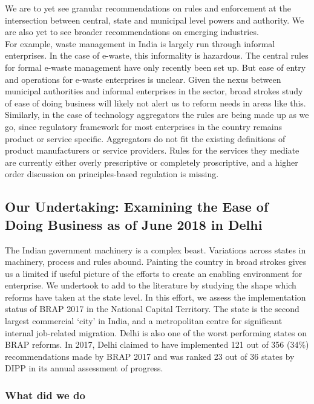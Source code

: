 \documentclass[a4paper, 12pt, twoside]{article}
\begin{document}
We are to yet see granular recommendations on rules and enforcement at the intersection between central, state and municipal level powers and authority. We are also yet to see broader recommendations on emerging industries.\\

For example, waste management in India is largely run through informal enterprises. In the case of e-waste, this informality is hazardous. The central rules for formal e-waste management have only recently been set up. But ease of entry and operations for e-waste enterprises is unclear. Given the nexus between municipal authorities and informal enterprises in the sector, broad strokes study of ease of doing business will likely not alert us to reform needs in areas like this.\\

Similarly, in the case of technology aggregators the rules are being made up as we go, since regulatory framework for most enterprises in the country remains product or service specific. Aggregators do not fit the existing definitions of product manufacturers or service providers. Rules for the services they mediate are currently either overly prescriptive or completely proscriptive, and a higher order discussion on principles-based regulation is missing. \\

\subsection*{Our Undertaking: Examining the Ease of Doing Business as of June 2018 in Delhi}

The Indian government machinery is a complex beast. Variations across states in machinery, process and rules abound. Painting the country in broad strokes gives us a limited if useful picture of the efforts to create an enabling environment for enterprise. 
We undertook to add to the literature by studying the shape which reforms have taken at the state level. In this effort, we assess the implementation status of BRAP 2017 in the National Capital Territory. The state is the second largest commercial ‘city’ in India, and a metropolitan centre for significant internal job-related migration. Delhi is also one of the worst performing states on BRAP reforms. In 2017, Delhi claimed to have implemented 121 out of 356 (34\%) recommendations made by BRAP 2017 and was ranked 23 out of 36 states by DIPP in its annual assessment of progress. 

\subsubsection*{What did we do}
\end{document}
